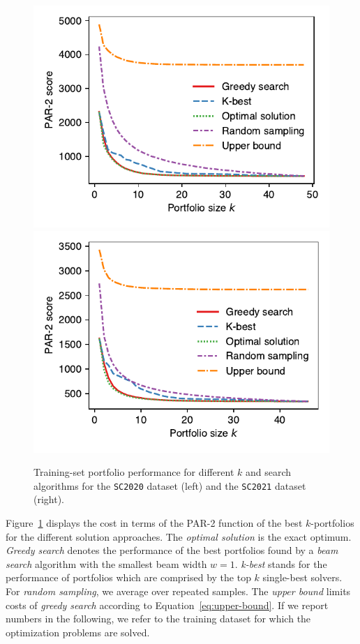 \documentclass[conference]{IEEEtran}
\begin{document}
\begin{figure}[t]
	\centering
	\includegraphics[width=0.9\columnwidth]{plots/search-train-objective-2020.pdf}
	\qquad
	\includegraphics[width=0.9\columnwidth]{plots/search-train-objective-2021.pdf}
	\caption{Training-set portfolio performance for different $k$ and search algorithms for the \texttt{SC2020} dataset (left) and the \texttt{SC2021} dataset (right).}
	\label{fig:search-train-objective}
\end{figure}

Figure~\ref{fig:search-train-objective} displays the cost in terms of the PAR-2 function of the best $k$-portfolios for the different solution approaches. 
The \emph{optimal solution} is the exact optimum.
\emph{Greedy search} denotes the performance of the best portfolios found by a \emph{beam search} algorithm with the smallest beam width $w=1$. 
\emph{k-best} stands for the performance of portfolios which are comprised by the top $k$ single-best solvers. 
For \emph{random sampling}, we average over repeated samples.
The \emph{upper bound} limits costs of \emph{greedy search} according to Equation~\ref{eq:upper-bound}.
If we report numbers in the following, we refer to the training dataset for which the optimization problems are solved. %
\end{document}

